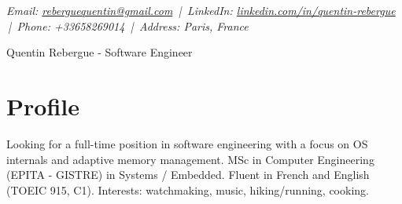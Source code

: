 \documentclass[9pt,a4paper]{article}
\newcommand{\namefont}{\fontsize{18}{22}\selectfont}
\newcommand{\tinyscript}{\fontsize{8}{8}\selectfont}
\begin{document}
\renewcommand\normalsize{\fontsize{10.5}{15}\selectfont}
\normalsize

\begin{center}
  {\tinyscript\itshape
  Email: \href{mailto:reberguequentin@gmail.com}{reberguequentin@gmail.com} \,|\,
  LinkedIn: \href{https://linkedin.com/in/quentin-rebergue}{linkedin.com/in/quentin-rebergue} \,|\,
  Phone: +33658269014 \,|\,
  Address: Paris, France}
\end{center}

\begin{center}
  {\namefont Quentin Rebergue - Software Engineer}
\end{center}

\section*{Profile}
\begin{tcolorbox}[mybox2]
Looking for a full-time position in software engineering with a focus on OS internals and adaptive memory management. MSc in Computer Engineering (EPITA - GISTRE) in Systems / Embedded. Fluent in French and English (TOEIC 915, C1). Interests: watchmaking, music, hiking/running, cooking.
\end{tcolorbox}
\end{document}
